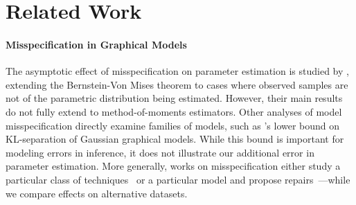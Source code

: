  \section{Related Work}
 \vspace{-.5em}

\vspace{-0.5em}
\paragraph{Misspecification in Graphical Models}
The asymptotic effect of misspecification on parameter estimation is studied by \cite{kleijn2012}, extending the Bernstein-Von Mises theorem to cases where observed samples are not of the parametric distribution being estimated. %
However, their main results do not fully extend to method-of-moments estimators. Other analyses of model misspecification directly examine families of models, such as \cite{JogL15}'s lower bound on KL-separation of Gaussian graphical models. While this bound is important for modeling errors in inference,
it does not illustrate our additional error in parameter estimation. More generally, works on misspecification either study a particular class of techniques~\citep{Blasi13} or a particular model and propose repairs~\citep{Grunwald17}---while we compare effects on alternative datasets.

